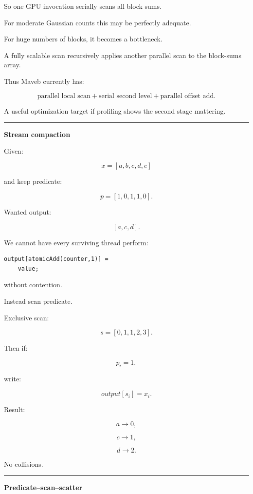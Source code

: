 So one GPU invocation serially scans all block sums.

For moderate Gaussian counts this may be perfectly adequate.

For huge numbers of blocks, it becomes a bottleneck.

A fully scalable scan recursively applies another parallel scan to the block-sums array.

Thus Maveb currently has:

\[
\boxed{
\text{parallel local scan}
+
\text{serial second level}
+
\text{parallel offset add}.
}
\]

A useful optimization target if profiling shows the second stage mattering.

\begin{center}\rule{0.5\linewidth}{0.5pt}\end{center}

\textbf{Stream compaction}

Given:

\[
x=[a,b,c,d,e]
\]

and keep predicate:

\[
p=[1,0,1,1,0].
\]

Wanted output:

\[
[a,c,d].
\]

We cannot have every surviving thread perform:

\protect{}\label{ddkrn5}%
\begin{verbatim}
output[atomicAdd(counter,1)] =
    value;
\end{verbatim}

without contention.

Instead scan predicate.

Exclusive scan:

\[
s=
[0,1,1,2,3].
\]

Then if:

\[
p_i=1,
\]

write:

\[
\boxed{
output[s_i]=x_i.
}
\]

Result:

\[
a\rightarrow0,
\]

\[
c\rightarrow1,
\]

\[
d\rightarrow2.
\]

No collisions.

\begin{center}\rule{0.5\linewidth}{0.5pt}\end{center}

\textbf{Predicate--scan--scatter}

